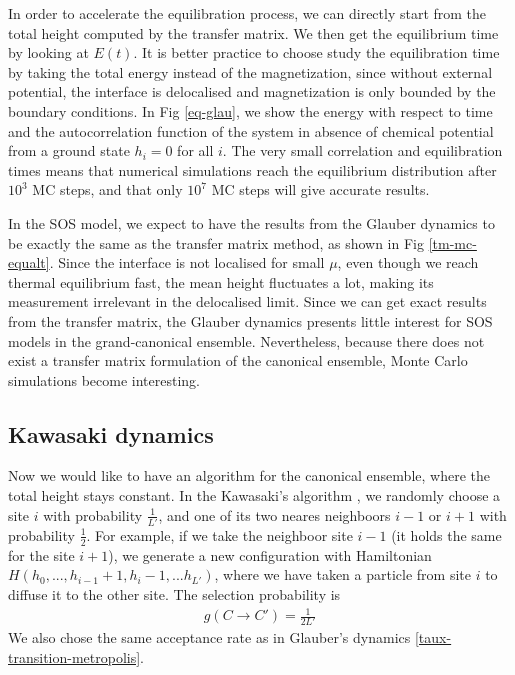 In order to accelerate the equilibration process, we can directly start from the total height computed by the transfer matrix. We then get the equilibrium time by looking at $E(t)$. It is better practice to choose study the equilibration time by taking the total energy instead of the magnetization, since without external potential, the interface is delocalised and magnetization is only bounded by the boundary conditions. In Fig \ref{eq-glau}, we show the energy with respect to time and the autocorrelation function of the system in absence of chemical potential from a ground state $h_i=0$ for all $i$. The very small correlation and equilibration times means that numerical simulations reach the equilibrium distribution after $10^3$ MC steps, and that only $10^7$ MC steps will give accurate results.

In the SOS model, we expect to have the results from the Glauber dynamics to be exactly the same as the transfer matrix method, as shown in Fig \ref{tm-mc-equalt}. Since the interface is not localised for small $\mu$, even though we reach thermal equilibrium fast, the mean height  fluctuates a lot, making its measurement irrelevant in the delocalised limit. Since we can get exact results from the transfer matrix, the Glauber dynamics presents little interest for SOS models in the grand-canonical ensemble. Nevertheless, because there does not exist a transfer matrix formulation of the canonical ensemble, Monte Carlo simulations become interesting.

\subsection{Kawasaki dynamics}

Now we would like to have an algorithm for the canonical ensemble, where the total height stays constant. In the Kawasaki's algorithm \cite{kawasaki_diffusion_1966}, we randomly choose a site $i$ with probability $\frac{1}{L'}$, and one of its two neares neighboors $i-1$ or $i+1$ with probability $\frac{1}{2}$. For example, if we take the neighboor site $i-1$ (it holds the same for the site $i+1$), we generate a new configuration with Hamiltonian $H(h_0,...,h_{i-1}+1,h_i-1,...h_{L'})$, where we have taken a particle from site $i$ to diffuse it to the other site.
The selection probability is
\begin{align}
g(C\to C') = \frac{1}{2L'}
\end{align}
We also chose the same acceptance rate as in Glauber's dynamics \eqref{taux-transition-metropolis}.

